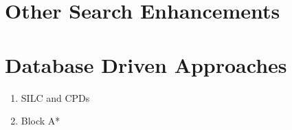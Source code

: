 \section{Other Search Enhancements}
\label{cha::lit::enhancements}


\section{Database Driven Approaches}
\label{cha::lit::enhancements::db}

\begin{enumerate}
\item{SILC and CPDs}
\item{Block A*}
\end{enumerate}


